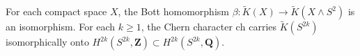 For each compact space $X$, the Bott homomorphism $\beta \colon \tilde{K}(X) \to \tilde{K}(X \wedge S^2)$ is an isomorphism. For each $k \geq 1$, the Chern character $\mathrm{ch}$ carries $\tilde{K}(S^{2k})$ isomorphically onto $H^{2k}(S^{2k}, \mathbf{Z}) \subset H^{2k}(S^{2k}, \mathbf{Q})$.
